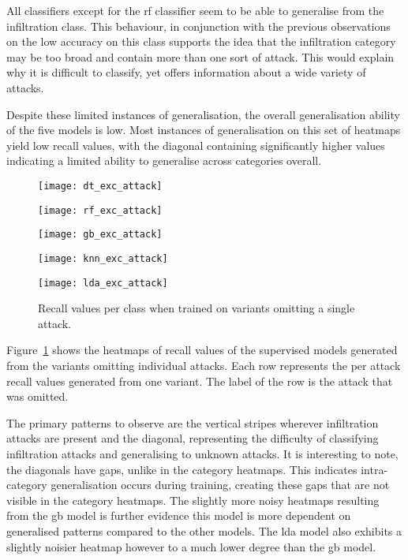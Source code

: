 All classifiers except for the \gls{rf} classifier seem to be able to
generalise from the infiltration class. This behaviour, in conjunction with the
previous observations on the low accuracy on this class supports the idea that
the infiltration category may be too broad and contain more than one sort of
attack. This would explain why it is difficult to classify, yet offers
information about a wide variety of attacks.

Despite these limited instances of generalisation, the overall generalisation
ability of the five models is low. Most instances of generalisation on this set
of heatmaps yield low recall values, with the diagonal containing significantly
higher values indicating a limited ability to generalise across categories
overall.
%
\begin{figure}[htbp]
    \centering
    \begin{minipage}[h]{0.5\textwidth}
        \centering
        \texttt{[image: dt\_exc\_attack]}
    \end{minipage}\hfill
    \begin{minipage}[h]{0.5\textwidth}
        \centering
        \texttt{[image: rf\_exc\_attack]}
    \end{minipage}
    \begin{minipage}[h]{0.5\textwidth}
        \centering
        \texttt{[image: gb\_exc\_attack]}
    \end{minipage}\hfill
    \begin{minipage}[h]{0.5\textwidth}
        \centering
        \texttt{[image: knn\_exc\_attack]}
    \end{minipage}
    \begin{minipage}[h]{0.5\textwidth}
        \centering
        \texttt{[image: lda\_exc\_attack]}
    \end{minipage}
    \caption[Individual Attack Omission Results.]{Recall values per class when trained on variants omitting a single attack.\label{fig:exc_att}}
\end{figure}
%
Figure~\ref{fig:exc_att} shows the heatmaps of recall values of the supervised
models generated from the variants omitting individual attacks. Each row
represents the per attack recall values generated from one variant. The label
of the row is the attack that was omitted.

The primary patterns to observe are the vertical stripes wherever infiltration
attacks are present and the diagonal, representing the difficulty of
classifying infiltration attacks and generalising to unknown attacks. It is
interesting to note, the diagonals have gaps, unlike in the category heatmaps.
This indicates intra-category generalisation occurs during training, creating
these gaps that are not visible in the category heatmaps. The slightly more
noisy heatmaps resulting from the \gls{gb} model is further evidence this model
is more dependent on generalised patterns compared to the other models. The
\gls{lda} model also exhibits a slightly noisier heatmap however to a much
lower degree than the \gls{gb} model.

